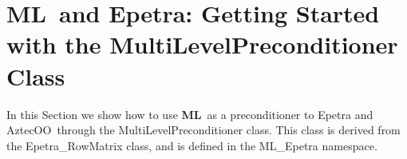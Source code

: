 \documentclass{article}[11pt]
\newcommand{\Aztecoo}  {{\sc AztecOO}}
\newcommand{\aztecoo}  {{\Aztecoo}}
\newcommand{\ML}     {{\bf ML}}
\newcommand{\trilinos}  {{\sc Trilinos}}
\newcommand{\superlu}  {{\sc SuperLU}}
\begin{document}

%
%
%


\newpage

\section{\ML\ and Epetra: Getting Started with the MultiLevelPreconditioner
Class}\label{sec:getting_started}

In this Section we show how to use \ML\ as a preconditioner to {\sc
  Epetra} and \aztecoo~through the MultiLevelPreconditioner
class. This class is derived from the
  Epetra\_RowMatrix class, and is defined in the ML\_Epetra namespace.
\end{document}
